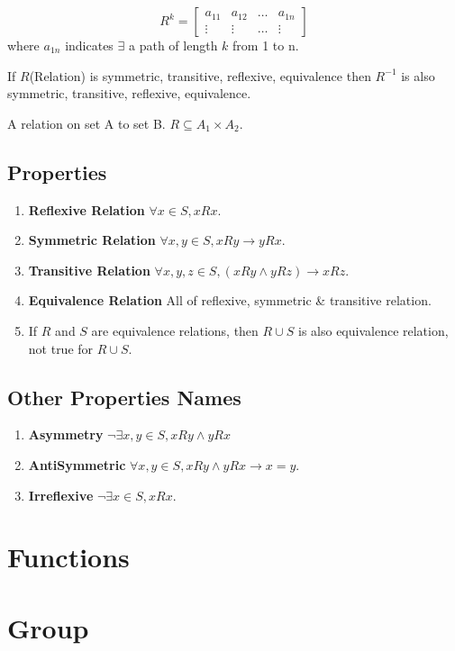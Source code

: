 \documentclass[a4paper,oneside]{book}
\begin{document}
\begin{definition}
$$ R^{k} = \begin{bmatrix}
a_{11} & a_{12} & \ldots & a_{1n}\\
\vdots & \vdots & \ldots & \vdots
\end{bmatrix}$$ where $a_{1n}$ indicates $\exists$ a path of length $k$ from 1 to n.
\end{definition}
\begin{theorem}
If $R$(Relation) is symmetric, transitive, reflexive, equivalence then $R^{-1}$ is also symmetric, transitive, reflexive, equivalence.
\end{theorem}
\begin{definition}
A relation on set A to set B. $R \subseteq A_1 \times A_2$.
\end{definition}
\section{Properties}
\begin{enumerate}
\item \textbf{Reflexive Relation} $\forall x \in S, xRx$. 
\item \textbf{Symmetric Relation} $\forall x,y \in S, xRy \to yRx$.
\item \textbf{Transitive Relation} $\forall x,y,z \in S, (xRy \wedge yRz) \to xRz$.
\item \textbf{Equivalence Relation} All of reflexive, symmetric \& transitive relation.
\item If $R$ and $S$ are equivalence relations, then $R \cup S$ is also equivalence relation, not true for $R \cup S$.
\end{enumerate}
\section{Other Properties Names}
\begin{enumerate}
\item \textbf{Asymmetry} $\neg\exists x,y \in S, xRy \wedge yRx$
\item \textbf{AntiSymmetric} $\forall x,y \in S, xRy \wedge yRx \to x = y$.
\item \textbf{Irreflexive} $\neg\exists x \in S, xRx$.
\end{enumerate}
\chapter{Functions}
\chapter{Group}
\end{document}
